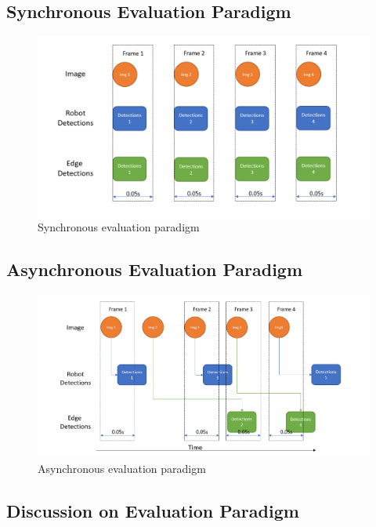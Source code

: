 \subsection{Synchronous Evaluation Paradigm}

\begin{figure}[htp]
    \centering
    \includegraphics[width=120mm]{figures/setup/sync_eval.png}
    \caption{Synchronous evaluation paradigm}
    \label{fig:sync_eval}
\end{figure}

\subsection{Asynchronous Evaluation Paradigm}

\begin{figure}[htp]
    \centering
    \includegraphics[width=120mm]{figures/setup/async_eval.png}
    \caption{Asynchronous evaluation paradigm}
    \label{fig:async_eval}
\end{figure}

\subsection{Discussion on Evaluation Paradigm}